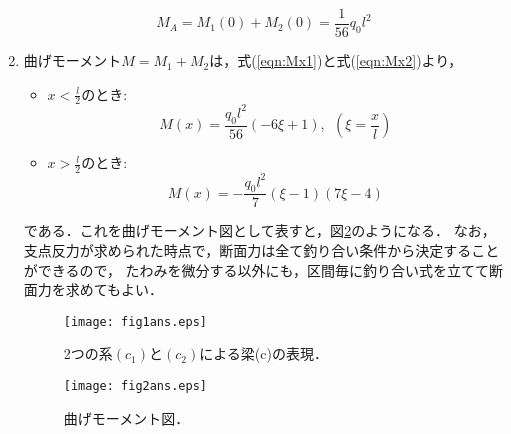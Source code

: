 \documentclass[10pt,a4j]{jarticle}
\begin{document}
\begin{enumerate}
\begin{equation}
	M_A=M_1(0)+M_2(0)= \frac{1}{56}q_0l^2
\end{equation}
\item
曲げモーメント$M=M_1+M_2$は，式(\ref{eqn:Mx1})と式(\ref{eqn:Mx2})より，
\begin{itemize}
\item
	$x<\frac{l}{2}$のとき:
	\begin{equation}
		M(x)=\frac{q_0l^2}{56}( -6 \xi +1), \ \ \left( \xi=\frac{x}{l}\right)
		\label{eqn:M_left}
	\end{equation}
\item
	$x>\frac{l}{2}$のとき:
	\begin{equation}
		M(x)=-\frac{q_0l^2}{7}(\xi-1)(7\xi-4)
		\label{eqn:M_right}
	\end{equation}
\end{itemize}
である．これを曲げモーメント図として表すと，図\ref{fig:fig2}のようになる．
なお，支点反力が求められた時点で，断面力は全て釣り合い条件から決定することができるので，
たわみを微分する以外にも，区間毎に釣り合い式を立てて断面力を求めてもよい．
\begin{figure}[h]
	\begin{center}
	\texttt{[image: fig1ans.eps]} 
	\end{center}
	\caption{2つの系$(c_1)$と$(c_2)$による梁(c)の表現．}
	\label{fig:fig1}
\end{figure}
\begin{figure}[h]
	\begin{center}
	\texttt{[image: fig2ans.eps]} 
	\end{center}
	\caption{曲げモーメント図．}
	\label{fig:fig2}
\end{figure}
\end{enumerate}
\end{document}
